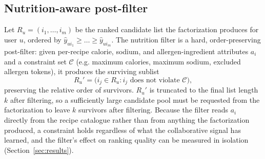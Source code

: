 \subsection{Nutrition-aware post-filter}
Let $R_u = (i_1, \dots, i_m)$ be the ranked candidate list the
factorization produces for user $u$, ordered by $\hat y_{u i_1} \ge \dots
\ge \hat y_{u i_m}$. The nutrition filter is a hard, order-preserving
post-filter: given per-recipe calorie, sodium, and allergen-ingredient
attributes $a_i$ and a constraint set $\mathcal{C}$ (e.g. maximum calories,
maximum sodium, excluded allergen tokens), it produces the surviving
sublist
\[
R_u' = \big( i_j \in R_u : i_j \text{ does not violate } \mathcal{C} \big),
\]
preserving the relative order of survivors. $R_u'$ is truncated to the
final list length $k$ after filtering, so a sufficiently large candidate
pool must be requested from the factorization to leave $k$ survivors after
filtering. Because the filter reads $a_i$ directly from the recipe
catalogue rather than from anything the factorization produced, a
constraint holds regardless of what the collaborative signal has learned,
and the filter's effect on ranking quality can be measured in isolation
(Section~\ref{sec:results}).
